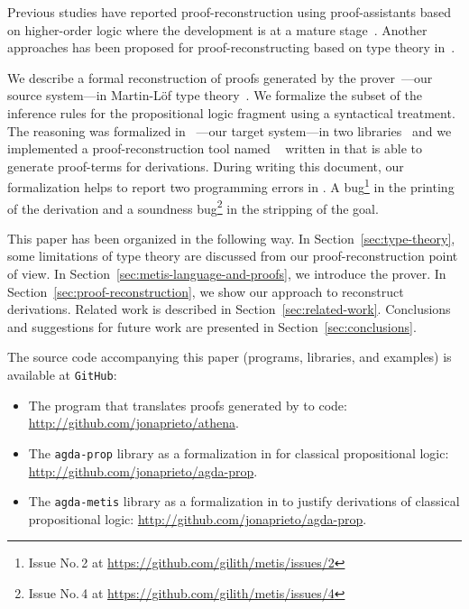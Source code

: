 \documentclass[../main.tex]{subfiles}
\begin{document}
Previous studies have reported proof-reconstruction using
proof-assistants based on higher-order logic where the development is at a mature
stage~\cite{paulson2010three,hurlin07practical,kaliszyk2013}.
Another approaches has been proposed for proof-reconstructing based
on type theory in~\cite{Bezem2002,kanso2016light,Keller2013}.

We describe a formal reconstruction of proofs generated by the \Metis
prover~\cite{hurd2003first}---our source system---in Martin-Löf type
theory~\cite{Nordstrom-Petersson-Smith-1990}. We
formalize the subset of the \Metis inference rules for the
propositional logic fragment using a syntactical treatment.
The \Metis reasoning was formalized in
\Agda~\cite{agdateam}---our target system---in two
libraries~\cite{AgdaProp,AgdaMetis} and we implemented a
proof-reconstruction tool named \Athena~\cite{Athena} written in
\Haskell that is able to generate \Agda proof-terms for \Metis
derivations. During writing this document, our formalization helps to report two programming errors in \Metis.
A bug\footnote{Issue No.\,2 at \url{https://github.com/gilith/metis/issues/2}} in the printing of the derivation and a soundness bug\footnote{Issue No.\,4 at \url{https://github.com/gilith/metis/issues/4}} in the stripping of the goal.


This paper has been organized in the following way.  In
Section~\ref{sec:type-theory}, some limitations of type theory are
discussed from our proof-reconstruction point of view.  In
Section~\ref{sec:metis-language-and-proofs}, we introduce the \Metis
prover.  In Section~\ref{sec:proof-reconstruction}, we show our
approach to reconstruct \Metis derivations.  Related work is described in
Section~\ref{sec:related-work}.  Conclusions and suggestions for
future work are presented in Section~\ref{sec:conclusions}.

The source code accompanying this paper (programs, libraries, and
examples) is available at \verb!GitHub!:

\begin{itemize}
  \item The \Athena program that translates proofs generated by \Metis
  to \Agda code: \url{http://github.com/jonaprieto/athena}.

  \item The \verb!agda-prop! library as a formalization in \Agda for
    classical propositional logic:
  \url{http://github.com/jonaprieto/agda-prop}.

  \item The \verb!agda-metis! library as a formalization in \Agda to
  justify \Metis derivations of classical propositional logic:
  \url{http://github.com/jonaprieto/agda-prop}.

\end{itemize}
\end{document}

